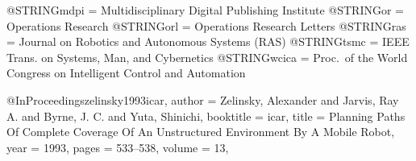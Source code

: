 @STRING{mdpi	= {Multidisciplinary Digital Publishing Institute} }
@STRING{or		= {Operations Research} }
@STRING{orl		= {Operations Research Letters} }
@STRING{ras     = {Journal on Robotics and Autonomous Systems (RAS)} }
@STRING{tsmc	= {IEEE Trans. on Systems, Man, and Cybernetics} }
@STRING{wcica	= {Proc.~of the World Congress on Intelligent Control and Automation} }

@InProceedings{zelinsky1993icar,
	author    = {Zelinsky, Alexander and Jarvis, Ray A. and Byrne, J. C. and Yuta, Shinichi},
	booktitle = icar,
	title     = {Planning Paths Of Complete Coverage Of An Unstructured Environment By A Mobile Robot},
	year      = {1993},
	pages     = {533--538},
	volume    = {13},
}

\fi
